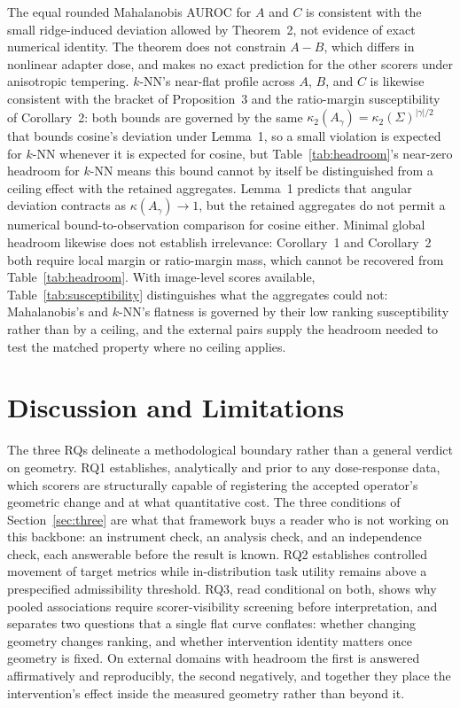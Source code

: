 \documentclass[11pt,a4paper]{article}
\begin{document}
The equal rounded Mahalanobis AUROC for $A$ and $C$ is consistent with the small ridge-induced deviation allowed by Theorem~2, not evidence of exact numerical identity. The theorem does not constrain $A-B$, which differs in nonlinear adapter dose, and makes no exact prediction for the other scorers under anisotropic tempering. $k$-NN's near-flat profile across $A$, $B$, and $C$ is likewise consistent with the bracket of Proposition~3 and the ratio-margin susceptibility of Corollary~2: both bounds are governed by the same $\kappa_2(A_\gamma)=\kappa_2(\Sigma)^{|\gamma|/2}$ that bounds cosine's deviation under Lemma~1, so a small violation is expected for $k$-NN whenever it is expected for cosine, but Table~\ref{tab:headroom}'s near-zero headroom for $k$-NN means this bound cannot by itself be distinguished from a ceiling effect with the retained aggregates. Lemma~1 predicts that angular deviation contracts as $\kappa(A_\gamma)\rightarrow1$, but the retained aggregates do not permit a numerical bound-to-observation comparison for cosine either. Minimal global headroom likewise does not establish irrelevance: Corollary~1 and Corollary~2 both require local margin or ratio-margin mass, which cannot be recovered from Table~\ref{tab:headroom}. With image-level scores available, Table~\ref{tab:susceptibility} distinguishes what the aggregates could not: Mahalanobis's and $k$-NN's flatness is governed by their low ranking susceptibility rather than by a ceiling, and the external pairs supply the headroom needed to test the matched property where no ceiling applies.

\section{Discussion and Limitations}
The three RQs delineate a methodological boundary rather than a general verdict on geometry. RQ1 establishes, analytically and prior to any dose-response data, which scorers are structurally capable of registering the accepted operator's geometric change and at what quantitative cost. The three conditions of Section~\ref{sec:three} are what that framework buys a reader who is not working on this backbone: an instrument check, an analysis check, and an independence check, each answerable before the result is known. RQ2 establishes controlled movement of target metrics while in-distribution task utility remains above a prespecified admissibility threshold. RQ3, read conditional on both, shows why pooled associations require scorer-visibility screening before interpretation, and separates two questions that a single flat curve conflates: whether changing geometry changes ranking, and whether intervention identity matters once geometry is fixed. On external domains with headroom the first is answered affirmatively and reproducibly, the second negatively, and together they place the intervention's effect inside the measured geometry rather than beyond it.
\end{document}
